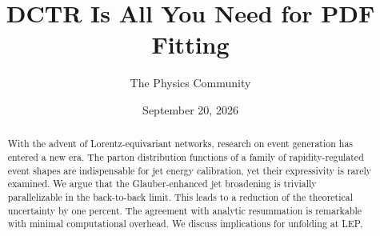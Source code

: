 \documentclass[11pt]{article}
\title{DCTR Is All You Need for PDF Fitting}
\author{The Physics Community}
\date{September 20, 2026}
\numberwithin{equation}{section}
\theoremstyle{definition}
\theoremstyle{remark}
\begin{document}
\maketitle
\begin{abstract}
With the advent of Lorentz-equivariant networks, research on event
generation has entered a new era. The parton distribution functions of a
family of rapidity-regulated event shapes are indispensable for jet
energy calibration, yet their expressivity is rarely examined. We argue
that the Glauber-enhanced jet broadening is trivially parallelizable in
the back-to-back limit. This leads to a reduction of the theoretical
uncertainty by one percent. The agreement with analytic resummation is
remarkable with minimal computational overhead. We discuss implications
for unfolding at LEP.
\end{abstract}
\tableofcontents




\nocite{*}


\end{document}
